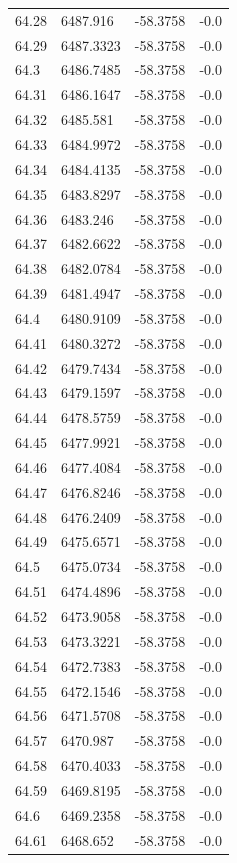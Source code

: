 \begin{table}[H]
\begin{tabular}{llll}
64.28 & 6487.916 & -58.3758 & -0.0 \\
64.29 & 6487.3323 & -58.3758 & -0.0 \\
64.3 & 6486.7485 & -58.3758 & -0.0 \\
64.31 & 6486.1647 & -58.3758 & -0.0 \\
64.32 & 6485.581 & -58.3758 & -0.0 \\
64.33 & 6484.9972 & -58.3758 & -0.0 \\
64.34 & 6484.4135 & -58.3758 & -0.0 \\
64.35 & 6483.8297 & -58.3758 & -0.0 \\
64.36 & 6483.246 & -58.3758 & -0.0 \\
64.37 & 6482.6622 & -58.3758 & -0.0 \\
64.38 & 6482.0784 & -58.3758 & -0.0 \\
64.39 & 6481.4947 & -58.3758 & -0.0 \\
64.4 & 6480.9109 & -58.3758 & -0.0 \\
64.41 & 6480.3272 & -58.3758 & -0.0 \\
64.42 & 6479.7434 & -58.3758 & -0.0 \\
64.43 & 6479.1597 & -58.3758 & -0.0 \\
64.44 & 6478.5759 & -58.3758 & -0.0 \\
64.45 & 6477.9921 & -58.3758 & -0.0 \\
64.46 & 6477.4084 & -58.3758 & -0.0 \\
64.47 & 6476.8246 & -58.3758 & -0.0 \\
64.48 & 6476.2409 & -58.3758 & -0.0 \\
64.49 & 6475.6571 & -58.3758 & -0.0 \\
64.5 & 6475.0734 & -58.3758 & -0.0 \\
64.51 & 6474.4896 & -58.3758 & -0.0 \\
64.52 & 6473.9058 & -58.3758 & -0.0 \\
64.53 & 6473.3221 & -58.3758 & -0.0 \\
64.54 & 6472.7383 & -58.3758 & -0.0 \\
64.55 & 6472.1546 & -58.3758 & -0.0 \\
64.56 & 6471.5708 & -58.3758 & -0.0 \\
64.57 & 6470.987 & -58.3758 & -0.0 \\
64.58 & 6470.4033 & -58.3758 & -0.0 \\
64.59 & 6469.8195 & -58.3758 & -0.0 \\
64.6 & 6469.2358 & -58.3758 & -0.0 \\
64.61 & 6468.652 & -58.3758 & -0.0 \\

\end{tabular}
\end{table}

